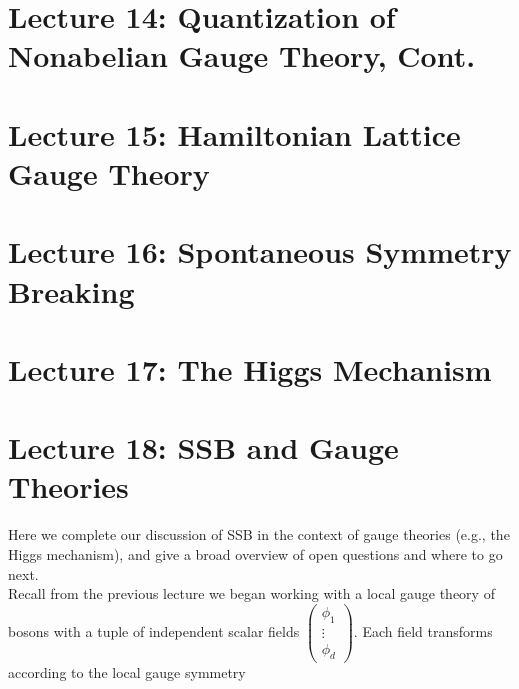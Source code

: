 \documentclass[10pt]{article}
\begin{document}


\clearpage

\section*{Lecture 14: Quantization of Nonabelian Gauge Theory, Cont.}
\label{sec: lec14}



\clearpage

\section*{Lecture 15: Hamiltonian Lattice Gauge Theory}
\label{sec: lec15}



\clearpage

\section*{Lecture 16: Spontaneous Symmetry Breaking}
\label{sec: lec16}



\clearpage

\section*{Lecture 17: The Higgs Mechanism}
\label{sec: lec17}



\clearpage

\section*{Lecture 18: SSB and Gauge Theories}
\label{sec: lec18}

\noindent Here we complete our discussion of SSB in the context of gauge theories (e.g., the Higgs mechanism), and give a broad overview of open questions and where to go next. \\

\noindent Recall from the previous lecture we began working with a local gauge theory of bosons with a tuple of independent scalar fields $\begin{pmatrix} \phi_1 \\ \vdots \\ \phi_d \end{pmatrix}$. Each field transforms according to the local gauge symmetry
\end{document}
